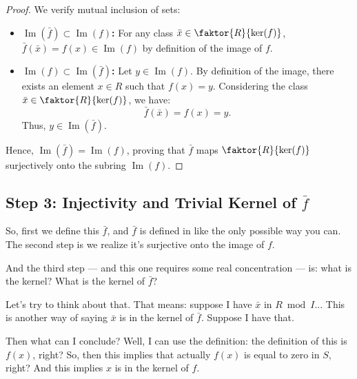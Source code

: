 \begin{proofWrapper}
\begin{content}
\begin{proof}
We verify mutual inclusion of sets:
\begin{itemize}
    \item \textbf{$\operatorname{Im}(\bar{f}) \subset \operatorname{Im}(f)$:} For any class $\bar{x} \in \faktor{R}{\ker(f)}$, $\bar{f}(\bar{x}) = f(x) \in \operatorname{Im}(f)$ by definition of the image of $f$.
    \item \textbf{$\operatorname{Im}(f) \subset \operatorname{Im}(\bar{f})$:} Let $y \in \operatorname{Im}(f)$. By definition of the image, there exists an element $x \in R$ such that $f(x) = y$. Considering the class $\bar{x} \in \faktor{R}{\ker(f)}$, we have:
    \[
    \bar{f}(\bar{x}) = f(x) = y.
    \]
    Thus, $y \in \operatorname{Im}(\bar{f})$.
\end{itemize}
Hence, $\operatorname{Im}(\bar{f}) = \operatorname{Im}(f)$, proving that $\bar{f}$ maps $\faktor{R}{\ker(f)}$ surjectively onto the subring $\operatorname{Im}(f)$.
\end{proof}
\end{content}

\subsection{Step 3: Injectivity and Trivial Kernel of \texorpdfstring{$\bar{f}$}{fbar}}

\begin{speech}[01:04:17 - 01:06:42]
So, first we define this $\bar{f}$, and $\bar{f}$ is defined in like the only possible way you can. The second step is we realize it's surjective onto the image of $f$. 

And the third step --- and this one requires some real concentration --- is: what is the kernel? What is the kernel of $\bar{f}$?  

Let's try to think about that. That means: suppose I have $\bar{x}$ in $R \bmod I$...  This is another way of saying $\bar{x}$ is in the kernel of $\bar{f}$. Suppose I have that. 

Then what can I conclude? Well, I can use the definition: the definition of this is $f(x)$, right? So, then this implies that actually $f(x)$ is equal to zero in $S$, right?  And this implies $x$ is in the kernel of $f$.  


\end{speech}
\end{proofWrapper}
